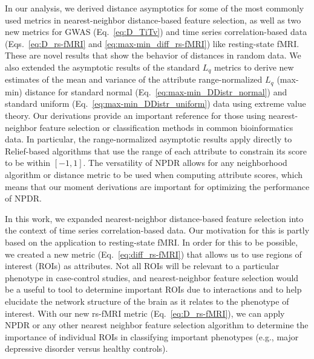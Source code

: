 \documentclass[10pt,letterpaper]{article}
\begin{document}
In our analysis, we derived distance asymptotics for some of the most commonly used metrics in nearest-neighbor distance-based feature selection, as well as two new metrics for GWAS (Eq.~\ref{eq:D_TiTv}) and time series correlation-based data (Eqs.~\ref{eq:D_rs-fMRI} and \ref{eq:max-min_diff_rs-fMRI}) like resting-state fMRI. These are novel results that show the behavior of distances in random data. We also extended the asymptotic results of the standard $L_q$ metrics to derive new estimates of the mean and variance of the attribute range-normalized $L_q$ (max-min) distance for standard normal (Eq.~\ref{eq:max-min_DDistr_normal}) and standard uniform (Eq.~\ref{eq:max-min_DDistr_uniform}) data using extreme value theory. Our derivations provide an important reference for those using nearest-neighbor feature selection or classification methods in common bioinformatics data. In particular, the range-normalized asymptotic results apply directly to Relief-based algorithms that use the range of each attribute to constrain its score to be within $[-1,1]$. The versatility of NPDR allows for any neighborhood algorithm or distance metric to be used when computing attribute scores, which means that our moment derivations are important for optimizing the performance of NPDR.

In this work, we expanded nearest-neighbor distance-based feature selection into the context of time series correlation-based data. Our motivation for this is partly based on the application to resting-state fMRI. In order for this to be possible, we created a new metric (Eq.~\ref{eq:diff_rs-fMRI}) that allows us to use regions of interest (ROIs) as attributes. Not all ROIs will be relevant to a particular phenotype in case-control studies, and nearest-neighbor feature selection would be a useful to tool to determine important ROIs due to interactions and to help elucidate the network structure of the brain as it relates to the phenotype of interest. With our new rs-fMRI metric (Eq.~\ref{eq:D_rs-fMRI}), we can apply NPDR or any other nearest neighbor feature selection algorithm to determine the importance of individual ROIs in classifying important phenotypes (e.g., major depressive disorder versus healthy controls).
\end{document}
